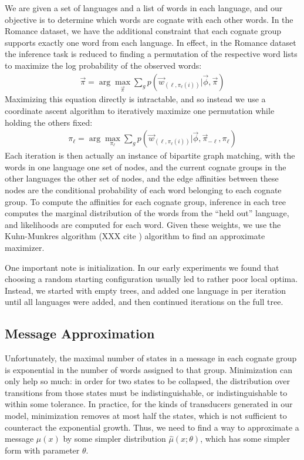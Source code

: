 \documentclass[11pt,a4paper]{article}
\begin{document}
We are given a set of languages and a list of words
in each language, and our objective is to determine which words are
cognate with each other words. In the Romance dataset, we have the
additional constraint that each cognate group supports exactly one
word from each language. In effect, in the Romance dataset the 
inference task is reduced to finding a permutation of the respective
word lists to maximize the log probability of the observed words:
\begin{equation}
  \begin{split}
    \vec{\pi} = \arg\!\max_{\vec \pi} \sum_{g} p(\vec w_{(\ell,\pi_\ell(i))}|\vec \phi,\vec \pi)
   \end{split}
 \end{equation}
Maximizing this equation directly is intractable, and so instead
we use a coordinate ascent algorithm to iteratively maximize one
permutation while holding the others fixed:
\begin{equation}
  \begin{split}
    \pi_\ell = \arg\!\max_{\pi_\ell} \sum_{g} p(\vec w_{(\ell,\pi_\ell(i))}|\vec \phi,\vec \pi_{-\ell},\pi_\ell)
  \end{split}
\end{equation}
Each iteration is then actually an instance of bipartite graph
matching, with the words in one language one set of nodes, and the
current cognate groups in the other languages the other set of
nodes, and the edge affinities between these nodes are the conditional
probability of each word belonging to each cognate group. To compute
the affinities for each cognate group, inference in each tree
computes the marginal distribution of the words from the ``held
out'' language, and likelihoods are computed for each word.  Given
these weights, we use the Kuhn-Munkres algorithm (XXX cite ) algorithm
to find an approximate maximizer.

One important note is initialization. In our early experiments we
found that choosing a random starting configuration usually led to
rather poor local optima. Instead, we started with empty trees, and
added one language in per iteration until all languages were added,
and then continued iterations on the full tree.

\subsection{Message Approximation}

Unfortunately, the maximal number of states in a message in each
cognate group is exponential in the number of words assigned to
that group. Minimization can only help so much: in order for two
states to be collapsed, the distribution over transitions from those
states must be indistinguishable, or indistinguishable to within
some tolerance. In practice, for the kinds of transducers generated
in our model, minimization removes at most half the states, which
is not sufficient to counteract the exponential growth. Thus, we
need to find a way to approximate a message $\mu(x)$ by some simpler
distribution $\hat\mu(x;\theta)$, which has some simpler form with
parameter $\theta$.
\end{document}

